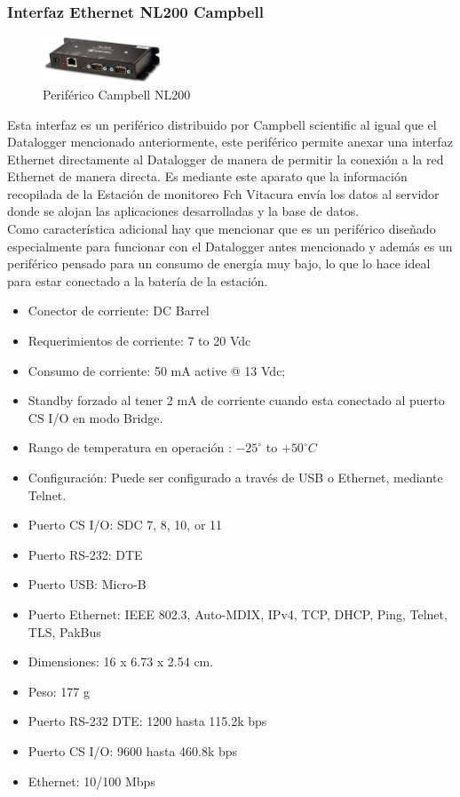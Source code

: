 \subsubsection{Interfaz Ethernet NL200 Campbell}

\begin{figure}[h!]
        \centering
        \includegraphics[width=100pt]{images/nl200}
        \caption{Periférico Campbell NL200} 
\end{figure}

Esta interfaz es un periférico distribuido por Campbell scientific al igual que el Datalogger mencionado anteriormente, este periférico permite anexar una interfaz Ethernet directamente al Datalogger de manera de permitir la conexión a la red Ethernet de manera directa. Es mediante este aparato que la información recopilada de la Estación de monitoreo Fch Vitacura envía los datos al servidor donde se alojan las aplicaciones desarrolladas y la base de datos.\\

Como característica adicional hay que mencionar que es un periférico diseñado especialmente para funcionar con el Datalogger antes mencionado y además es un periférico pensado para un consumo de energía muy bajo, lo que lo hace ideal para estar conectado a la batería de la estación.

\begin{itemize}
\item Conector de corriente: DC Barrel
\item Requerimientos de corriente: 7 to 20 Vdc 
\item Consumo de corriente: 50 mA active @ 13 Vdc;
\item Standby forzado al tener 2 mA de corriente cuando esta conectado al puerto CS I/O en modo Bridge.
\item Rango de temperatura en operación : ${-25}^{\circ}$ to ${+50}^{\circ}C$
\item Configuración: Puede ser configurado a través de USB o Ethernet, mediante Telnet.
\item Puerto CS I/O: SDC 7, 8, 10, or 11
\item Puerto RS-232: DTE
\item Puerto USB: Micro-B
\item Puerto Ethernet: IEEE 802.3, Auto-MDIX, IPv4, TCP, DHCP, Ping, Telnet, TLS, PakBus
\item Dimensiones: 16 x 6.73 x 2.54 cm.
\item Peso: 177 g
\item Puerto RS-232 DTE: 1200 hasta 115.2k bps
\item Puerto CS I/O: 9600 hasta 460.8k bps
\item Ethernet: 10/100 Mbps
\end{itemize}

